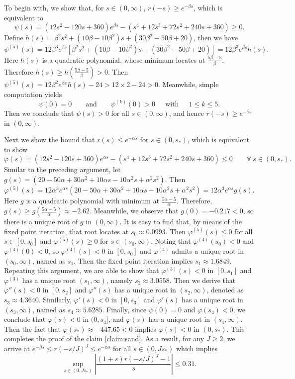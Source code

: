To begin with, we show that, for $s\in(0,\infty)$, $r(-s) \ge e^{-\beta s}$, which is equivalent to
$$\psi(s) = (12s^2-120s+360)e^{\beta s} -(s^4+12s^3+72s^2 + 240s + 360)
 \ge 0.$$
Define $h(s) = \beta^2s^2 + (10\beta-10\beta^2)s+(30\beta^2-50\beta+20)$,
then we have
$$\psi^{(5)}(s) = 12\beta^3e^{\beta s}
\left[\beta^2s^2 + (10\beta-10\beta^2)s+(30\beta^2-50\beta+20)\right]
=12\beta^3e^{\beta s}h(s).$$
Here $h(s)$ is a quadratic polynomial, whose
minimum locates at $\frac{5\beta-5}{\beta}$.
Therefore $h(s) \geq h (\tfrac{5\beta-5}{\beta} ) > 0$.
Then $\psi^{(5)}(s) = 12\beta^2e^{\beta x}h(s)-24 > 12\times 2-24>0$.
Meanwhile, simple computation yields
$$ \psi(0)=0 \qquad \text{and}
\qquad \psi^{(k)}(0)>0~~\quad \text{with}~~ \quad
1\le k\le 5.  $$
Then we conclude that  $\psi(s) > 0$ for all  $s\in (0, \infty)$, and hence
 $r(-s) \ge e^{-\beta s}$ in $(0, \infty)$.

Next we show the bound that $r(s) \le e^{-\alpha s}$ for $s\in (0,s_*)$, which is equivalent to show
$$\varphi(s) = (12s^2-120s+360)e^{\alpha s}
-(s^4+12s^3+72s^2 + 240s + 360) \le 0 \qquad \forall~s\in (0,s_*).$$
Similar to the preceding argument, let $g(s) = (20-50 \alpha + 30 \alpha^2  +10\alpha s -10\alpha^2s +\alpha^2s^2)$. Then
$$  \varphi^{(5)}(s) = 12\alpha^3e^{\alpha s}
(20-50 \alpha + 30 \alpha^2
+10\alpha s -10\alpha^2s +\alpha^2s^2)
= 12\alpha^3e^{\alpha s}  g(s). $$
Here $g$ is a quadratic polynomial with minimum at $\frac{5\alpha-5}{\alpha}$. Therefore, $g(s)\ge g(\tfrac{5\alpha-5}{\alpha}) \approx -2.62$.
Meanwhile, we observe that $g(0) = -0.217 <0$, so
there is a unique root of $g$ in $(0, \infty)$.
It is easy to find that, by means of the fixed point iteration,
that root locates at $s_0\approx0.0993$. Then $\varphi^{(5)}(s) \le 0$
for all $s\in [0,s_0]$ and $\varphi^{(5)}(s) \ge 0$ for $s\in (s_0,\infty)$. Noting that $\varphi^{(4)}(s_0) < 0$ and $\varphi^{(4)}(0) < 0$, so $\varphi^{(4)}(s) < 0$ in $[0,s_0]$ and $\varphi^{(4)}$ admits a unique root in $(s_0,\infty)$, named as $s_1$.
Then the fixed point iteration implies $s_1\approx  1.6849$.
Repeating this argument, we are able to show that
$\varphi^{(3)}(s) < 0$ in $[0,s_1]$ and $\varphi^{(3)}$ has a unique root $(s_1,\infty)$, namely $s_2\approx 3.0558$.
Then we derive that
$\varphi{''}(s) < 0$ in $[0,s_2]$ and  $\varphi{''}(s)$
has a unique root in $(s_2,\infty)$,
denoted as $s_3\approx 4.3640$.
Similarly, $\varphi{'}(s) < 0$ in $[0,s_3]$ and  $\varphi{'}(s)$
has a unique root in $(s_3,\infty)$, named as $s_4\approx 5.6285$.
Finally, since $\psi(0)=0$ and $\varphi(s_4)<0$, we conclude that
$\varphi(s)<0$ in $(0,s_4]$, and $\varphi(s)$ has a unique root in $(s_4,\infty)$. Then the fact that $\varphi(s_*) \approx -447.65<0$ implies $\varphi(s)<0$ in $(0,s_*)$.
This completes the proof of the claim \eqref{claim:sand}.
As a result, for any $J\ge 2$, we arrive at $e^{-\beta s} \le r(-s/J)^J \le e^{-\alpha s}$
for all $s\in(0, J s_*)$ which  implies
\begin{equation*}
    \sup_{s\in(0, J s_*)}
    \left|\frac{(1+s) r(-s/J)^J-1}{s}\right| \le 0.31.
\end{equation*}

